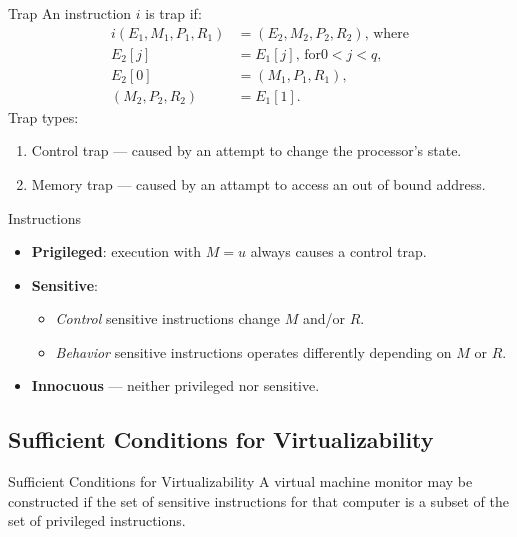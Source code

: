 \begin{frame}{Trap}
An instruction $i$ is trap if:
\begin{equation*}
  \begin{aligned}
  i(E_1, M_1, P_1, R_1) &= (E_2, M_2, P_2, R_2)\text{, where} \\
  E_2[j] &= E_1[j]\text{, for} 0 < j < q, \\
  E_2[0] &= (M_1, P_1, R_1), \\
  (M_2, P_2, R_2) &= E_1[1].
  \end{aligned}
\end{equation*}
\pause\vfill
Trap types:
\begin{enumerate}
\item Control trap --- caused by an attempt to change the processor's state.
\item Memory trap --- caused by an attampt to access an out of bound address.
\end{enumerate}
\end{frame}

\begin{frame}{Instructions}
\begin{itemize}
\item \textbf{Prigileged}: execution with $M=u$ always causes a
  control trap.\pause
\item \textbf{Sensitive}:
  \begin{itemize}
  \item \textit{Control} sensitive instructions change $M$ and/or $R$.
  \item \textit{Behavior} sensitive instructions operates differently depending
    on $M$ or $R$.\pause
  \end{itemize}
  \item \textbf{Innocuous} --- neither privileged nor sensitive.
\end{itemize}
\end{frame}

\subsection{Sufficient Conditions for Virtualizability}

\begin{frame}{Sufficient Conditions for Virtualizability}
A virtual machine monitor may be constructed if the set of sensitive instructions for that computer is a subset of the set of privileged instructions.
\vfill\centering
{} 
\end{frame}

